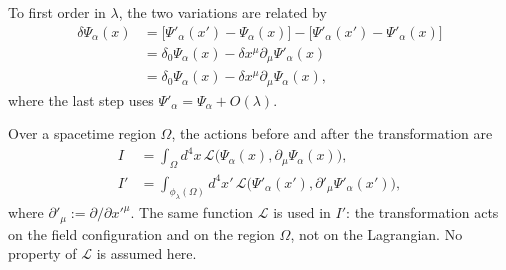\documentclass[11pt,a4paper]{article}
\begin{document}
To first order in $\lambda$, the two variations are related by
\begin{equation*}
\begin{aligned}
\delta\Psi_\alpha(x)
&=\bigl[\Psi'_\alpha(x')-\Psi_\alpha(x)\bigr]
-\bigl[\Psi'_\alpha(x')-\Psi'_\alpha(x)\bigr]\\
&=\delta_0\Psi_\alpha(x)-\delta x^\mu\partial_\mu\Psi'_\alpha(x)\\
&=\delta_0\Psi_\alpha(x)-\delta x^\mu\partial_\mu\Psi_\alpha(x),
\end{aligned}
\tag{1.7}\label{eq:1.7}
\end{equation*}
where the last step uses $\Psi'_\alpha=\Psi_\alpha+O(\lambda)$.

Over a spacetime region $\Omega$, the actions before and after the transformation are
\begin{equation*}
\begin{aligned}
I&=\int_\Omega d^4x\,
\mathcal L\bigl(\Psi_\alpha(x),\partial_\mu\Psi_\alpha(x)\bigr),\\
I'&=\int_{\phi_\lambda(\Omega)}d^4x'\,
\mathcal L\bigl(\Psi'_\alpha(x'),\partial'_\mu\Psi'_\alpha(x')\bigr),
\end{aligned}
\tag{1.8}\label{eq:1.8}
\end{equation*}
where $\partial'_\mu:=\partial/\partial x'^\mu$. The same function $\mathcal L$ is used in $I'$: the transformation acts on the field configuration and on the region $\Omega$, not on the Lagrangian. No property of $\mathcal L$ is assumed here.
\end{document}
